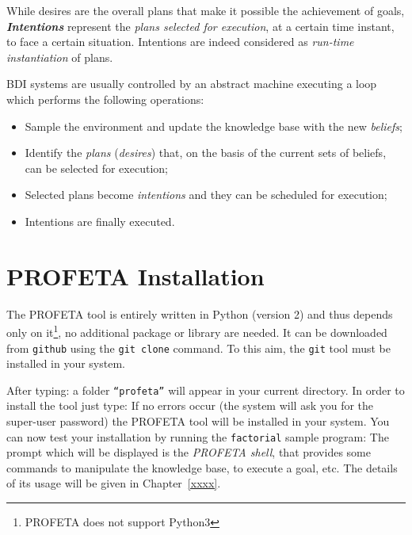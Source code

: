 While desires are the overall plans that make it possible the achievement
of goals, \textbf{\emph{Intentions}} represent the \emph{plans selected for
execution}, at a certain time instant, to face a certain situation.
Intentions are indeed considered as \emph{run-time instantiation} of plans.

BDI systems are usually controlled by an abstract machine executing a loop
which performs the following operations:
\begin{itemize}
\item Sample the environment and update the knowledge base with the new
  \emph{beliefs};
\item Identify the \emph{plans} (\emph{desires})
  that, on the basis of the current sets of beliefs, can be selected for
  execution;
\item Selected plans become \emph{intentions} and they can be scheduled for
  execution;
\item Intentions are finally executed.
\end{itemize}


\section{PROFETA Installation}
The PROFETA tool is entirely written in Python (version 2)  and thus
depends only on it\footnote{PROFETA does not
  support Python3},
no additional package or library are needed.
It can be downloaded from \texttt{github} using the
\texttt{git clone} command.
To this aim, the \texttt{git} tool must be installed in your system.

After typing:
a folder \texttt{``profeta''} will appear in your current directory.
In order to install the tool just type:
If no errors occur (the system will ask you for the super-user password)
the PROFETA tool will be installed in your system.
You can now test your installation by running the \texttt{factorial} sample
program:
The prompt which will be displayed is the \emph{PROFETA shell}, that
provides some commands to manipulate the knowledge base, to execute a
goal, etc.
The details of its usage will be given in Chapter~\ref{xxxx}.


